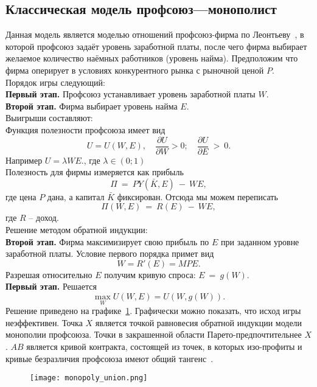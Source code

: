 \subsection{Классическая модель профсоюз---монополист}
\label{sec:monopoly}

Данная модель является моделью отношений профсоюз-фирма по Леонтьеву~\cite{LeontiefW}, в которой профсоюз задаёт уровень заработной платы, после чего фирма выбирает желаемое количество наёмных работников (уровень найма). Предположим что фирма оперирует в условиях конкурентного рынка с рыночной ценой $P$.\\

Порядок игры следующий:\\
\textbf{Первый этап.} Профсоюз устанавливает уровень заработной платы $W$.\\
\textbf{Второй этап.} Фирма выбирает уровень найма $E$.\\

Выигрыши составляют:\\
Функция полезности профсоюза имеет вид 
$$ U = U(W,E), \quad \frac{\partial U}{\partial W} > 0; \quad \frac{\partial U}{\partial E}~>~0.$$ 
Например $U = \lambda WE.$, где $\lambda \in (0; 1)$\\
Полезность для фирмы измеряется как прибыль 
$$\Pi~=~PY(\bar K,E)~-~WE,$$ 
где цена $P$ дана, а капитал $\bar K$ фиксирован. Отсюда мы можем переписать 
$$\Pi(W,E)~=~R(E)~-~WE,$$ 
где $R$ -- доход.\\

Решение методом обратной индукции:\\
\textbf{Второй этап.} Фирма максимизирует свою прибыль по $E$ при заданном уровне заработной платы. Условие первого порядка примет вид
$$ W = R'(E) = MPE. $$
Разрешая относительно $E$ получим кривую спроса: $E~=~g(W)$.\\
\textbf{Первый этап.} Решается
$$ \max_W U(W,E) = U(W,g(W)). $$
Решение приведено на графике~\ref{fig:monopoly_union}. Графически можно показать, что исход игры неэффективен. Точка $X$ является точкой равновесия обратной индукции модели монополии профсоюза. Точки в закрашенной области Парето-предпочтительнее $X$. $AB$ является кривой контракта, состоящей из точек, в которых изо-профиты и кривые безразличия профсоюза имеют общий тангенс~\cite{ShandongUniver}.


\begin{figure}[h]
	\texttt{[image: monopoly\_union.png]}
	\caption{}
	\label{fig:monopoly_union}
\end{figure}

